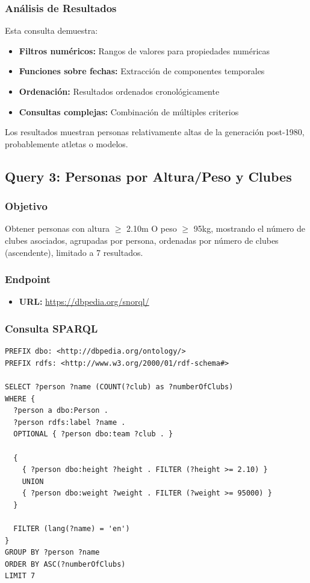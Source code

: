 \documentclass[12pt,a4paper]{article}
\begin{document}
\subsubsection{Análisis de Resultados}

Esta consulta demuestra:
\begin{itemize}
    \item \textbf{Filtros numéricos:} Rangos de valores para propiedades numéricas
    \item \textbf{Funciones sobre fechas:} Extracción de componentes temporales
    \item \textbf{Ordenación:} Resultados ordenados cronológicamente
    \item \textbf{Consultas complejas:} Combinación de múltiples criterios
\end{itemize}

Los resultados muestran personas relativamente altas de la generación post-1980, probablemente atletas o modelos.

\subsection{Query 3: Personas por Altura/Peso y Clubes}

\subsubsection{Objetivo}

Obtener personas con altura $\geq$ 2.10m O peso $\geq$ 95kg, mostrando el número de clubes asociados, agrupadas por persona, ordenadas por número de clubes (ascendente), limitado a 7 resultados.

\subsubsection{Endpoint}

\begin{itemize}
    \item \textbf{URL:} \url{https://dbpedia.org/snorql/}
\end{itemize}

\subsubsection{Consulta SPARQL}

\begin{lstlisting}[language=SPARQL, caption={Query 3: Personas por altura/peso y número de clubes}]
PREFIX dbo: <http://dbpedia.org/ontology/>
PREFIX rdfs: <http://www.w3.org/2000/01/rdf-schema#>

SELECT ?person ?name (COUNT(?club) as ?numberOfClubs)
WHERE {
  ?person a dbo:Person .
  ?person rdfs:label ?name .
  OPTIONAL { ?person dbo:team ?club . }
  
  {
    { ?person dbo:height ?height . FILTER (?height >= 2.10) }
    UNION
    { ?person dbo:weight ?weight . FILTER (?weight >= 95000) }
  }
  
  FILTER (lang(?name) = 'en')
}
GROUP BY ?person ?name
ORDER BY ASC(?numberOfClubs)
LIMIT 7
\end{lstlisting}
\end{document}
